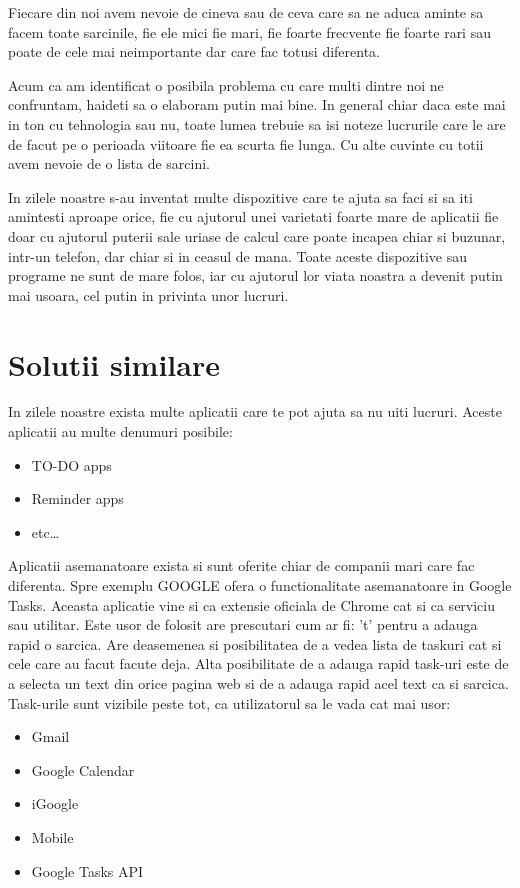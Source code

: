 \documentclass[conference]{IEEEtran}
\begin{document}
Fiecare din noi avem nevoie de cineva sau de ceva care sa ne aduca aminte sa facem toate sarcinile, fie ele mici fie mari, fie foarte frecvente fie foarte rari sau poate de cele mai neimportante dar care fac totusi diferenta.

Acum ca am identificat o posibila problema cu care multi dintre noi ne confruntam, haideti sa o elaboram putin mai bine. In general chiar daca este mai in ton cu tehnologia sau nu, toate lumea trebuie sa isi noteze lucrurile care le are de facut pe o perioada viitoare fie ea scurta fie lunga. Cu alte cuvinte cu totii avem nevoie de o lista de sarcini.

In zilele noastre s-au inventat multe dispozitive care te ajuta sa faci si sa iti amintesti aproape orice, fie cu ajutorul unei varietati foarte mare de aplicatii fie doar cu ajutorul puterii sale uriase de calcul care poate incapea chiar si buzunar, intr-un telefon, dar chiar si in ceasul de mana. Toate aceste dispozitive sau programe ne sunt de mare folos, iar cu ajutorul lor viata noastra a devenit putin mai usoara, cel putin in privinta unor lucruri.





\section{Solutii similare}

In zilele noastre exista multe aplicatii care te pot ajuta sa nu uiti lucruri. Aceste aplicatii au multe denumuri posibile:
\begin{itemize}
  \item TO-DO apps
  \item Reminder apps
  \item etc\ldots
\end{itemize}

Aplicatii asemanatoare exista si sunt oferite chiar de companii mari care fac diferenta. Spre exemplu GOOGLE ofera o functionalitate asemanatoare in Google Tasks. Aceasta aplicatie vine si ca extensie oficiala de Chrome cat si ca serviciu sau utilitar. Este usor de folosit are prescutari cum ar fi: 't' pentru a adauga rapid o sarcica. Are deasemenea si posibilitatea de a vedea lista de taskuri cat si cele care au facut facute deja. Alta posibilitate de a adauga rapid task-uri este de a selecta un text din orice pagina web si de a adauga rapid acel text ca si sarcica. Task-urile sunt vizibile peste tot, ca utilizatorul sa le vada cat mai usor: 
\begin{itemize}
  \item Gmail
  \item Google Calendar
  \item iGoogle
  \item Mobile
  \item Google Tasks API
\end{itemize}
\end{document}

